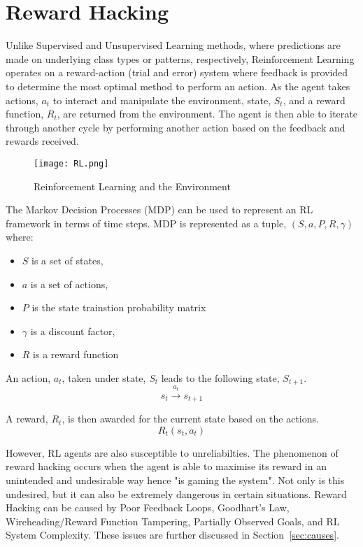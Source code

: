 \chapter{Reward Hacking}
\label{chap:chap5}
Unlike Supervised and Unsupervised Learning methods, where predictions are made on underlying class types or patterns, respectively, 
Reinforcement Learning operates on a reward-action (trial and error) system where feedback is provided to determine the most optimal method to perform an action.
As the agent takes actions, $a_t$ to interact and manipulate the environment, state, $S_t$, and a reward function, $R_t$, are returned from the environment. 
The agent is then able to iterate through another cycle by performing another action based on the feedback and rewards received.

\begin{figure}[H]
    \centering
    \caption{Reinforcement Learning and the Environment \cite{amiri_mehrpouyan_fridman_mallik_nallanathan_matolak_2018}}
    \texttt{[image: RL.png]}
    \label{fig:RL}
\end{figure}

\enlargethispage{-2\baselineskip}
The Markov Decision Processes (MDP) can be used to represent an RL framework in terms of time steps.
MDP is represented as a tuple, $(S, a, P, R, \gamma)$ where:
\begin{itemize}
    \item $S$ is a set of states,
    \item $a$ is a set of actions,
    \item $P$ is the state trainstion probability matrix
    \item $\gamma$ is a discount factor, 
    \item $R$ is a reward function 
\end{itemize}   

An action, $a_t$, taken under state, $S_t$ leads to the following state, $S_{t+1}$. 
\begin{equation}
    s_t \xrightarrow{a_t} s_{t+1}
\end{equation}

A reward, $R_t$, is then awarded for the current state based on the actions.
\begin{equation}
    R_t(s_t, a_t) 
\end{equation}

However, RL agents are also susceptible to unreliabilties. The phenomenon of reward hacking occurs when the agent is able to maximise its reward in an unintended and undesirable way hence "is gaming the system".
Not only is this undesired, but it can also be extremely dangerous in certain situations. 
Reward Hacking can be caused by Poor Feedback Loops, Goodhart's Law, Wireheading/Reward Function Tampering, Partially Observed Goals, and RL System Complexity. 
These issues are further discussed in Section~\ref{sec:causes}.

